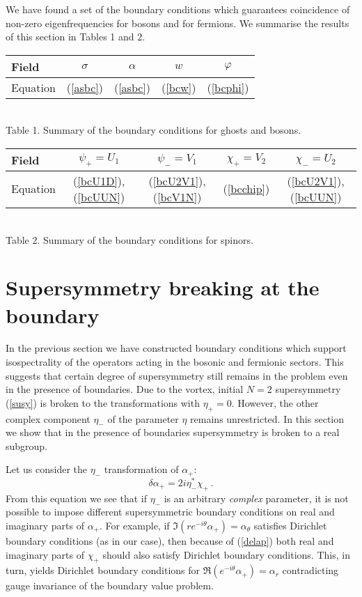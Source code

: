 \documentclass[a4paper,12pt]{article}
\begin{document}
We have found a set of the boundary conditions which guarantees 
coincidence of non-zero eigenfrequencies for bosons and for
fermions. 
We summarise the results of this section in Tables 1 and 2.

\begin{table}
\begin{tabular}{|l|c|c|c|c|}\hline
Field & $\sigma$ & $\alpha$ & $w$ & $\varphi$ 
\\ \hline
Equation & (\ref{asbc})& (\ref{asbc}) & (\ref{bcw}) & (\ref{bcphi}) 
\\ \hline
\end{tabular}\\[2pt] Table 1.
Summary of the boundary conditions for ghosts and bosons. 
\end{table}
\begin{table}
\begin{tabular}{|l|c|c|c|c|}\hline
Field & $\psi_+=U_1$ & $\psi_-=V_1$ & $\chi_+=V_2$ & $\chi_-=U_2$ 
\\ \hline
Equation & (\ref{bcU1D}), (\ref{bcUUN}) & (\ref{bcU2V1}), (\ref{bcV1N}) &
(\ref{bcchip}) & (\ref{bcU2V1}), (\ref{bcUUN})\\ \hline
\end{tabular}\\[2pt]
Table 2. Summary of the boundary conditions for spinors.
\end{table}
\section{Supersymmetry breaking at the boundary} \label{ssbsec}
In the previous section we have constructed boundary conditions
which support isospectrality of the operators acting in the
bosonic and fermionic sectors. This suggests that certain degree
of supersymmetry still remains in the problem even in the presence 
of boundaries. Due to the vortex, initial $N=2$ supersymmetry 
(\ref{susy}) is
broken to the transformations with $\eta_+=0$. However, the other
complex component $\eta_-$ of the parameter $\eta$ remains
unrestricted. In this section we show that in the presence of
boundaries supersymmetry is broken to a real subgroup.
 
Let us consider the $\eta_-$ transformation of $\alpha_+$:
\begin{equation}
\delta \alpha_+ =2i\eta_-^* \chi_+ \,.\label{delap}
\end{equation}
From this equation we see that if $\eta_-$ is an arbitrary
{\it complex} parameter, it is not possible to impose 
different supersymmetric boundary conditions on real
and imaginary parts of $\alpha_+$. For example, if 
$\Im (r e^{-i\theta}\alpha_+)=\alpha_\theta$ satisfies
Dirichlet boundary conditions (as in our case), then
because of (\ref{delap})
both real and imaginary parts of $\chi_+$ should also
satisfy Dirichlet boundary conditions. This, in turn,
yields Dirichlet boundary conditions for
$\Re (e^{-i\theta}\alpha_+)=\alpha_r$ contradicting gauge
invariance of the boundary value problem.
\end{document}
